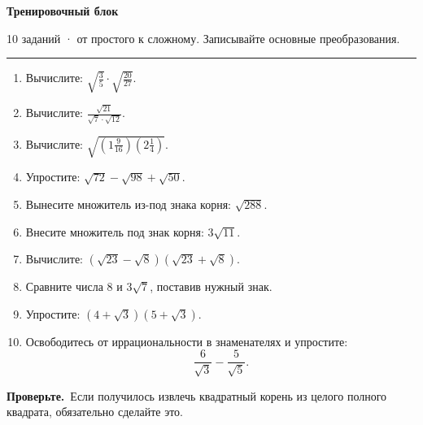 \documentclass[a4paper,12pt]{article}
\newcommand{\warn}[1]{\par\textcolor{accentdark}{\textbf{Проверьте.}}~#1\par}
\newcommand{\ruleline}{\par\vspace{.3em}\noindent\textcolor{accent}{\rule{\linewidth}{0.55pt}}\par\vspace{.35em}}
\begin{document}
\clearpage
\begin{center}{\Large\bfseries\textcolor{accentdark}{Тренировочный блок}}\end{center}
\vspace{.3cm}
\noindent\textcolor{muted}{10 заданий · от простого к сложному. Записывайте основные преобразования.}
\ruleline
\begin{enumerate}
\item Вычислите: \(\displaystyle\sqrt{\frac35}\cdot\sqrt{\frac{20}{27}}\).
\item Вычислите: \(\displaystyle\frac{\sqrt{21}}{\sqrt7\cdot\sqrt{12}}\).
\item Вычислите: \(\displaystyle\sqrt{\left(1\frac9{16}\right)\left(2\frac14\right)}\).
\item Упростите: \(\displaystyle\sqrt{72}-\sqrt{98}+\sqrt{50}\).
\item Вынесите множитель из-под знака корня: \(\sqrt{288}\).
\item Внесите множитель под знак корня: \(3\sqrt{11}\).
\item Вычислите: \((\sqrt{23}-\sqrt8)(\sqrt{23}+\sqrt8)\).
\item Сравните числа \(8\) и \(3\sqrt7\), поставив нужный знак.
\item Упростите: \((4+\sqrt3)(5+\sqrt3)\).
\item Освободитесь от иррациональности в знаменателях и упростите:
\[\frac6{\sqrt3}-\frac5{\sqrt5}.\]
\end{enumerate}
\vspace{.2cm}
\warn{Если получилось извлечь квадратный корень из целого полного квадрата, обязательно сделайте это.}
\end{document}

